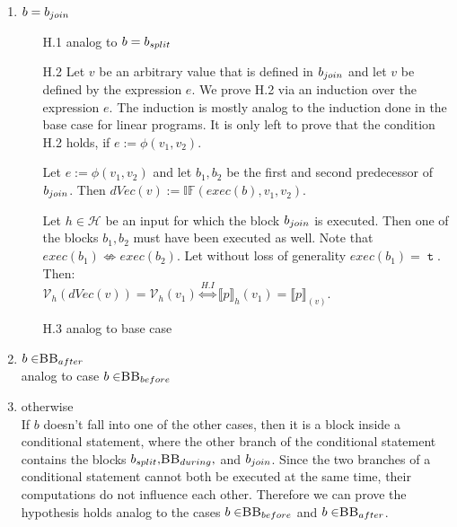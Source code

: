 \begin{enumerate}
    \item $b = b_{join}$\\
    \begin{itemize}
        \item[H.1] analog to $b = b_{split}$
        \item[H.2] Let $v$ be an arbitrary value that is defined in $b_{join}$ and let $v$ be defined by the expression $e$. We prove H.2 via an induction over the expression $e$. The induction is mostly analog to the induction done in the base case for linear programs. It is only left to prove that the condition H.2 holds, if $e := \phi(v_1, v_2)$.
        
        Let $e := \phi(v_1, v_2)$ and let $b_1, b_2$ be the first and second predecessor of $b_{join}$. Then $dVec(v) := \mathbb{IF}(exec(b), v_1, v_2)$.
        
        Let $h \in \mathcal{H}$ be an input for which the block $b_{join}$ is executed. Then one of the blocks $b_1, b_2$ must have been executed as well. Note that $exec(b_1) \not\iff exec(b_2)$. Let without loss of generality $exec(b_1) = \mttt$. Then:\\ $\mathcal{V}_h(dVec(v)) = \mathcal{V}_h(v_1) \stackrel{H.I}{\iff} \llbracket p \rrbracket_h (v_1) = \llbracket p \rrbracket_(v)$. 
        \item[H.3] analog to base case
    \end{itemize}
    \item $b \in \mbb_{after}$\\
    analog to case $b \in \mbb_{before}$
    \item otherwise\\
    If $b$ doesn't fall into one of the other cases, then it is a block inside a conditional statement, where the other branch of the conditional statement contains the blocks $\splitt, \mbb_{during},$ and $b_{join}$. Since the two branches of a conditional statement cannot both be executed at the same time, their computations do not influence each other.
    Therefore we can prove the hypothesis holds analog to the cases $b \in \mbb_{before}$ and $b \in \mbb_{after}$.
\end{enumerate}